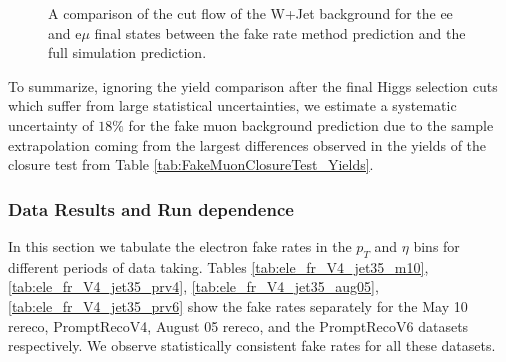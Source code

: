 \begin{figure}[!htbp]
\begin{center}
\caption{A comparison of the cut flow of the W+Jet background for the ee and e$\mu$ final states
between the fake rate method prediction and the full simulation prediction. }
\label{fig:FakeMuonClosureTest_CutFlow}
\end{center}
\end{figure}

To summarize, ignoring the yield comparison after the final Higgs selection cuts which 
suffer from large statistical uncertainties, we estimate a systematic uncertainty of 
$18\%$ for the fake muon background prediction due to the sample extrapolation 
coming from the largest differences observed in the yields of the closure test from 
Table \ref{tab:FakeMuonClosureTest_Yields}. 



\subsubsection{Data Results and Run dependence}
\label{sec:MuonFakeRateDataResults}

In this section we tabulate the electron fake rates in the $p_{T}$ and $\eta$ bins for different 
periods of data taking. Tables \ref{tab:ele_fr_V4_jet35_m10}, \ref{tab:ele_fr_V4_jet35_prv4}, 
\ref{tab:ele_fr_V4_jet35_aug05}, \ref{tab:ele_fr_V4_jet35_prv6} show the fake rates separately 
for the May 10 rereco, PromptRecoV4, August 05 rereco, and the PromptRecoV6 datasets respectively.
We observe statistically consistent fake rates for all these datasets.

